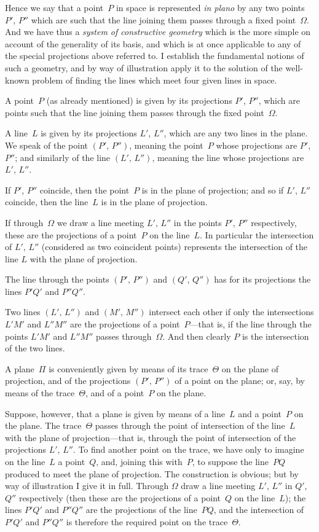 \documentclass[11pt,a4paper]{article}
\theoremstyle{plain}
\theoremstyle{definition}
\begin{document}
Hence we say that a point~$P$ in space is represented \textit{in plano} by any two points
$P'$, $P''$ which are such that the line joining them passes through a fixed point~$\Omega$.
And we have thus a \textit{system of constructive geometry} which is the more simple on
account of the generality of its basis, and which is at once applicable to any of the
special projections above referred to.  I establish the fundamental notions of such a
geometry, and by way of illustration apply it to the solution of the well-known problem
of finding the lines which meet four given lines in space.

A point~$P$ (as already mentioned) is given by its projections $P'$, $P''$, which are
points such that the line joining them passes through the fixed point~$\Omega$.

A line~$L$ is given by its projections $L'$, $L''$, which are any two lines in the plane.
We speak of the point $(P',\,P'')$, meaning the point~$P$ whose projections are $P'$, $P''$;
and similarly of the line $(L',\,L'')$, meaning the line whose projections are $L'$, $L''$.

If $P'$, $P''$ coincide, then the point~$P$ is in the plane of projection; and so if
$L'$, $L''$ coincide, then the line~$L$ is in the plane of projection.

If through~$\Omega$ we draw a line meeting $L'$, $L''$ in the points $P'$, $P''$ respectively,
these are the projections of a point~$P$ on the line~$L$.  In particular the intersection
of $L'$, $L''$ (considered as two coincident points) represents the intersection of the line
$L$ with the plane of projection.

\clearpage

The line through the points $(P',\,P'')$ and $(Q',\,Q'')$ has for its projections the lines
$P'Q'$ and $P''Q''$.

Two lines $(L',\,L'')$ and $(M',\,M'')$ intersect each other if only the intersections $L'M'$
and $L''M''$ are the projections of a point~$P$---that is, if the line through the points
$L'M'$ and $L''M''$ passes through~$\Omega$.  And then clearly $P$ is the intersection of the two
lines.

A plane~$\Pi$ is conveniently given by means of its trace~$\Theta$ on the plane of
projection, and of the projections $(P',\,P'')$ of a point on the plane; or, say, by means
of the trace~$\Theta$, and of a point~$P$ on the plane.

Suppose, however, that a plane is given by means of a line~$L$ and a point~$P$
on the plane.  The trace~$\Theta$ passes through the point of intersection of the line~$L$ with
the plane of projection---that is, through the point of intersection of the projections
$L'$, $L''$.  To find another point on the trace, we have only to imagine on the line~$L$
a point~$Q$, and, joining this with~$P$, to suppose the line~$PQ$ produced to meet the
plane of projection.  The construction is obvious; but by way of illustration I give it
in full.  Through $\Omega$ draw a line meeting $L'$, $L''$ in $Q'$, $Q''$ respectively (then these are
the projections of a point~$Q$ on the line~$L$); the lines $P'Q'$ and $P''Q''$ are the
projections of the line~$PQ$, and the intersection of $P'Q'$ and $P''Q''$ is therefore the required
point on the trace~$\Theta$.
\end{document}
